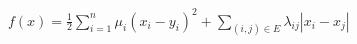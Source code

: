 $\displaystyle
f(x) = \frac{1}{2} \sum_{i=1}^n \mu_i (x_i - y_i)^2 + \sum_{(i,j) \in E} \lambda_{ij} |x_i - x_j|
$
